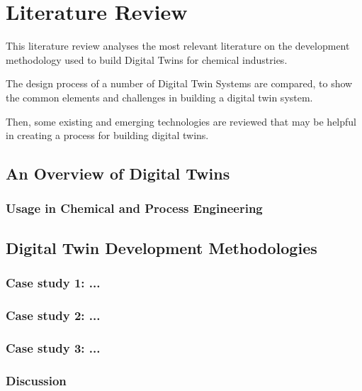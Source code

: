 
\section{Literature Review}

This literature review analyses the most relevant literature on the development methodology used to build Digital Twins for chemical industries.

The design process of a number of Digital Twin Systems are compared, to show the common elements and challenges in building a digital twin system.

Then, some existing and emerging technologies are reviewed that may be helpful in creating a process for building digital twins.

\subsection{An Overview of Digital Twins}



\subsubsection{Usage in Chemical and Process Engineering}




\subsection{Digital Twin Development Methodologies}

\subsubsection{Case study 1: ...}

\subsubsection{Case study 2: ...}

\subsubsection{Case study 3: ...}

\subsubsection{Discussion}



